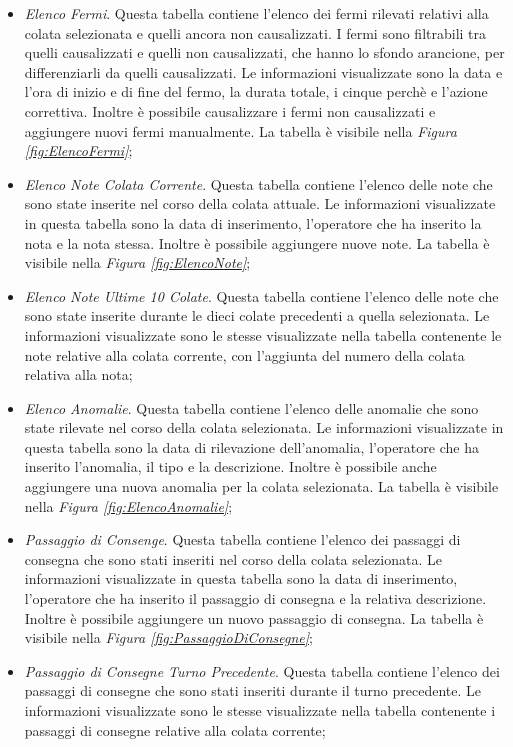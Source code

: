 \begin{itemize}
    \item \textit{Elenco Fermi}. Questa tabella contiene l'elenco dei fermi rilevati relativi alla colata selezionata 
    e quelli ancora non causalizzati. I fermi sono filtrabili tra quelli causalizzati e quelli non causalizzati,
    che hanno lo sfondo arancione, per differenziarli da quelli causalizzati. Le informazioni visualizzate sono la data e
    l'ora di inizio e di fine del fermo, la durata totale, i cinque perchè e
    l'azione correttiva. Inoltre è possibile causalizzare i fermi non causalizzati e aggiungere nuovi fermi manualmente.
    La tabella è visibile nella \textit{Figura \ref{fig:ElencoFermi}};

    \item \textit{Elenco Note Colata Corrente}. Questa tabella contiene l'elenco delle note che sono state inserite nel corso
    della colata attuale. Le informazioni visualizzate in questa tabella sono la data di inserimento, l'operatore che ha inserito
    la nota e la nota stessa. Inoltre è possibile aggiungere nuove note. La tabella è visibile nella
    \textit{Figura \ref{fig:ElencoNote}};

    \item \textit{Elenco Note Ultime 10 Colate}. Questa tabella contiene l'elenco delle note che sono state inserite durante le
    dieci colate precedenti a quella selezionata. Le informazioni visualizzate sono le stesse visualizzate nella tabella
    contenente le note relative alla colata corrente, con l'aggiunta del numero della colata relativa alla nota;


    \item \textit{Elenco Anomalie}. Questa tabella contiene l'elenco delle anomalie che sono state rilevate nel corso della
    colata selezionata. Le informazioni visualizzate in questa tabella sono la data di rilevazione dell'anomalia,
    l'operatore che ha inserito l'anomalia, il tipo e la descrizione.
    Inoltre è possibile anche aggiungere una nuova anomalia per la colata selezionata.
    La tabella è visibile nella \textit{Figura \ref{fig:ElencoAnomalie}};

    \item \textit{Passaggio di Consenge}. Questa tabella contiene l'elenco dei passaggi di consegna che sono stati inseriti
    nel corso della colata selezionata. Le informazioni visualizzate in questa tabella sono la data di inserimento, l'operatore
    che ha inserito il passaggio di consegna e la relativa descrizione. Inoltre è possibile aggiungere un nuovo passaggio
    di consegna. La tabella è visibile nella \textit{Figura \ref{fig:PassaggioDiConsegne}};

    \item \textit{Passaggio di Consegne Turno Precedente}. Questa tabella contiene l'elenco dei passaggi di consegne che sono
    stati inseriti durante il turno precedente. Le informazioni visualizzate sono le stesse visualizzate nella tabella
    contenente i passaggi di consegne relative alla colata corrente;

  \end{itemize}

